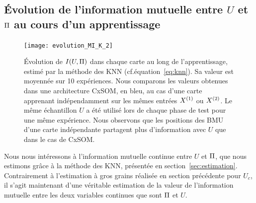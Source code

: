 \documentclass[../main]{subfiles}
\begin{document}
\subsection{\'Evolution de l'information mutuelle entre $U$ et $\Pi$ au cours d'un apprentissage}\label{sec:mi}

\begin{figure}
    \centering\texttt{[image: evolution\_MI\_K\_2]}
    \caption{\'Evolution de $I(U,\Pi)$ dans chaque carte au long de l'apprentissage, estimé par la méthode des KNN (cf.équation~\ref{eq:knn}).
    Sa valeur est moyennée sur 10 expériences. Nous comparons les valeurs obtenues dans une architecture CxSOM, en bleu, au cas d'une carte apprenant indépendamment sur les mêmes entrées $X^{({1})}$ ou $X^{({2})}$.
    Le même échantillon $U$ a été utilisé lors de chaque phase de test pour une même expérience.
    Nous observons que les positions des BMU d'une carte indépendante partagent plus d'information avec $U$ que dans le cas de CxSOM.
    \label{fig:MI_evol_total}}
    \end{figure}

Nous nous intéressons à l'information mutuelle continue entre $U$ et $\Pi$, que nous estimons grâce à la méthode des KNN, présentée en section~\ref{sec:estimation}. Contrairement à l'estimation à gros grains réalisée en section précédente pour $U_c$, il s'agit maintenant d'une véritable estimation de la valeur de l'information mutuelle entre les deux variables continues que sont $\Pi$ et $U$.
\end{document}

